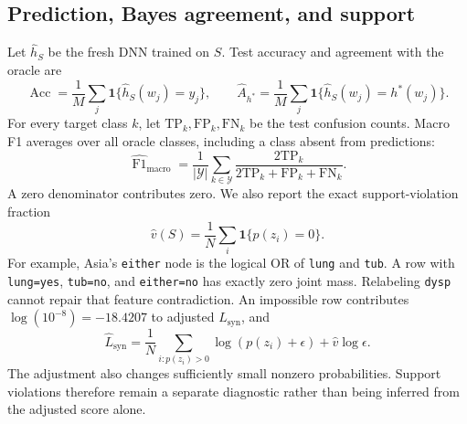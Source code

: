 \documentclass[11pt,letterpaper]{article}
\newcommand{\ind}{\mathbf{1}}
\newcommand{\Lsyn}{L_{\mathrm{syn}}}
\begin{document}
\subsection{Prediction, Bayes agreement, and support}
Let $\widehat h_S$ be the fresh DNN trained on $S$. Test accuracy and agreement with the oracle are
\begin{equation}
 \widehat{\operatorname{Acc}}=\frac1M\sum_j\ind\{\widehat h_S(w_j)=y_j\},\qquad
 \widehat A_{h^*}=\frac1M\sum_j\ind\{\widehat h_S(w_j)=h^*(w_j)\}.
\end{equation}
For every target class $k$, let $\mathrm{TP}_k,\mathrm{FP}_k,\mathrm{FN}_k$ be the test confusion counts. Macro F1 averages over all oracle classes, including a class absent from predictions:
\begin{equation}
 \widehat{\operatorname{F1}}_{\mathrm{macro}}
 =\frac1{|\mathcal{Y}|}\sum_{k\in\mathcal{Y}}
 \frac{2\mathrm{TP}_k}{2\mathrm{TP}_k+\mathrm{FP}_k+\mathrm{FN}_k}.
\end{equation}
A zero denominator contributes zero. We also report the exact support-violation fraction
\begin{equation}
 \widehat v(S)=\frac1N\sum_i\ind\{p(z_i)=0\}.
 \label{eq:support}
\end{equation}
For example, Asia's \texttt{either} node is the logical OR of \texttt{lung} and \texttt{tub}. A row with \texttt{lung=yes}, \texttt{tub=no}, and \texttt{either=no} has exactly zero joint mass. Relabeling \texttt{dysp} cannot repair that feature contradiction. An impossible row contributes $\log(10^{-8})=-18.4207$ to adjusted $\Lsyn$, and
\begin{equation}
 \widehat\Lsyn=\frac1N\sum_{i:p(z_i)>0}\log(p(z_i)+\epsilon)+\widehat v\log\epsilon.
\end{equation}
The adjustment also changes sufficiently small nonzero probabilities. Support violations therefore remain a separate diagnostic rather than being inferred from the adjusted score alone.
\end{document}
